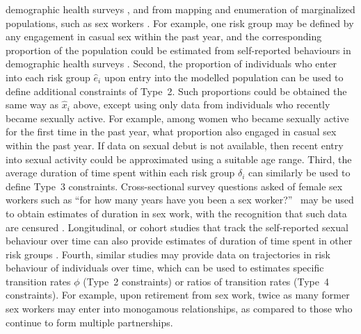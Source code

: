 demographic health surveys \citep{DHS}, and from
mapping and enumeration of marginalized populations,
such as sex workers \citep{Abdul-Quader2014}.
For example, one risk group may be defined by
any engagement in casual sex within the past year,
and the corresponding proportion of the population
could be estimated from self-reported behaviours
in demographic health surveys \citep{DHS}.
Second, the proportion of individuals who enter into each risk group $\hat{e}_i$
upon entry into the modelled population can be used to define additional constraints of Type~2.
Such proportions could be obtained the same way as $\hat{x}_i$ above,
except using only data from individuals who recently became sexually active.
For example, among women who became sexually active for the first time in the past year,
what proportion also engaged in casual sex within the past year.
If data on sexual debut is not available,
then recent entry into sexual activity could be approximated using
a suitable age range.
Third, the average duration of time spent within each risk group $\delta_i$
can similarly be used to define Type~3 constraints.
Cross-sectional survey questions asked of female sex workers such as
``for how many years have you been a sex worker?''\ %
may be used to obtain estimates of duration in sex work,
with the recognition that such data are censured \citep{Watts2010}.
Longitudinal, or cohort studies
that track the self-reported sexual behaviour over time can also provide 
estimates of duration of time spent in other risk groups \citep{Fergus2007}.
Fourth, similar studies may provide data on
trajectories in risk behaviour of individuals over time,
which can be used to estimates specific transition rates $\phi$ (Type~2 constraints)
or ratios of transition rates (Type~4 constraints).
For example, upon retirement from sex work,
twice as many former sex workers may enter into monogamous relationships,
as compared to those who continue to form multiple partnerships.
